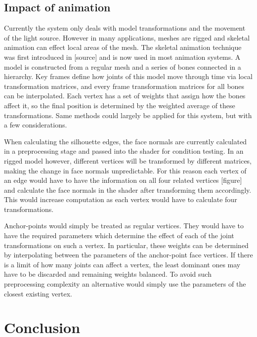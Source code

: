 \documentclass[a4paper, 12pt]{article}
\begin{document}
\subsection{Impact of animation}
Currently the system only deals with model transformations and the movement of the light source. However in many applications, meshes are rigged and skeletal animation can effect local areas of the mesh. The skeletal animation technique was first introduced in [source] and is now used in most animation systems. A model is constructed from a regular mesh and a series of bones connected in a hierarchy. Key frames define how joints of this model move through time via local transformation matrices, and every frame transformation matrices for all bones can be interpolated. Each vertex has a set of weights that assign how the bones affect it, so the final position is determined by the weighted average of these transformations. Same methods could largely be applied for this system, but with a few considerations.

When calculating the silhouette edges, the face normals are currently calculated in a preprocessing stage and passed into the shader for condition testing. In an rigged model however, different vertices will be transformed by different matrices, making the change in face normals unpredictable. For this reason each vertex of an edge would have to have the information on all four related vertices [figure] and calculate the face normals in the shader after transforming them accordingly. This would increase computation as each vertex would have to calculate four transformations.

Anchor-points would simply be treated as regular vertices. They would have to have the required parameters which determine the effect of each of the joint transformations on such a vertex. In particular, these weights can be determined by interpolating between the parameters of the anchor-point face vertices. If there is a limit of how many joints can affect a vertex, the least dominant ones may have to be discarded and remaining weights balanced. To avoid such preprocessing complexity an alternative would simply use the parameters of the closest existing vertex.



\section{Conclusion}
\end{document}
